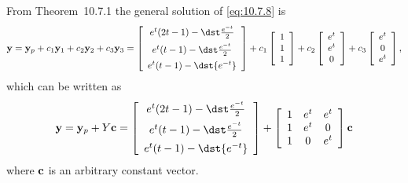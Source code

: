 \begin{examplesolution}
 From Theorem~10.7.1 the general solution of \eqref{eq:10.7.8} is
\[
  {\bf y}={\bf y}_{p}+c_{1}{\bf y}_{1}+c_{2}{\bf y}_{2}+c_{3}{\bf y}_{3}= \left[
  \begin{array}{c}
    e^{t}(2t-1)-\dst\frac{e^{-t}}{2} \\[5pt]
    e^{t}(t-1)-\dst\frac{e^{-t}}{2}  \\[5pt]
    e^{t}(t-1)-\dst{e^{-t}}
  \end{array}\right]+ c_{1}\left[
  \begin{array}{c}
    1 \\
    1 \\
    1
  \end{array}\right]+ c_{2}\left[
  \begin{array}{c}
    e^{t} \\
    e^{t} \\
    0
  \end{array}\right] +c_{3}\left[
  \begin{array}{c}
    e^{t} \\
    0     \\
    e^{t}
  \end{array}\right],
\]
which can be written as
\[
  {\bf y}={\bf y}_{p}+Y{\bf c}= \left[
  \begin{array}{c}
    e^{t}(2t-1)-\dst\frac{e^{-t}}{2} \\[5pt]
    e^{t}(t-1)-\dst\frac{e^{-t}}{2}  \\[5pt]
    e^{t}(t-1)-\dst{e^{-t}}
  \end{array}\right]+ \left[
  \begin{array}{ccc}
    1 & e^{t} & e^{t} \\
    1 & e^{t} & 0     \\
    1 & 0     & e^{t}
  \end{array}\right]{\bf c}
\]
where ${\bf c}$ is an arbitrary constant vector.
\end{examplesolution}

